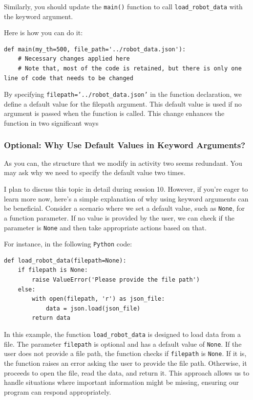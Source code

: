 Similarly, you should update the \texttt{main()} function to call \texttt{load\_robot\_data} with the keyword argument.

Here is how you can do it:

\begin{verbatim}
def main(my_th=500, file_path='../robot_data.json'):
    # Necessary changes applied here
    # Note that, most of the code is retained, but there is only one line of code that needs to be changed
\end{verbatim}


By specifying \texttt{filepath='../robot\_data.json'} in the function declaration, we define a default value for the filepath argument. This default value is used if no argument is passed when the function is called. This change enhances the function in two significant ways

\subsubsection{Optional: Why Use Default Values in Keyword Arguments?}

As you can, the structure that we modify in activity two seems redundant. You may ask why we need to specify the default value two times.

I plan to discuss this topic in detail during session 10. However, if you're eager to learn more now, here's a simple explanation of why using keyword arguments can be beneficial.
Consider a scenario where we set a default value, such as \texttt{None}, for a function parameter. If no value is provided by the user, we can check if the parameter is \texttt{None} and then take appropriate actions based on that.

For instance, in the following \texttt{Python} code:

\begin{verbatim}
def load_robot_data(filepath=None):
    if filepath is None:
        raise ValueError('Please provide the file path')
    else:
        with open(filepath, 'r') as json_file:
            data = json.load(json_file)
        return data
\end{verbatim}

In this example, the function \texttt{load\_robot\_data} is designed to load data from a file. The parameter \texttt{filepath} is optional and has a default value of \texttt{None}. If the user does not provide a file path, the function checks if \texttt{filepath} is \texttt{None}. If it is, the function raises an error asking the user to provide the file path. Otherwise, it proceeds to open the file, read the data, and return it.
This approach allows us to handle situations where important information might be missing, ensuring our program can respond appropriately.

